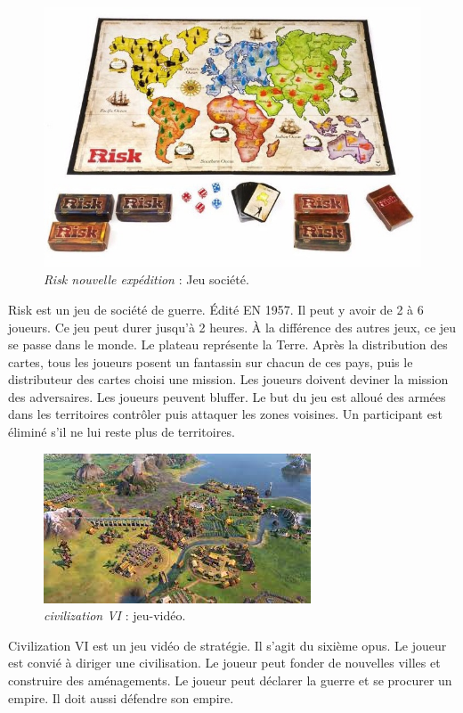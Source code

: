 \begin{figure}[H]
    \centering
    \includegraphics[scale=0.4]{data/risk.jpg}
    \caption{\textit{Risk nouvelle expédition} : Jeu société.}
\end{figure}
Risk est un jeu de société de guerre. Édité EN 1957. Il peut y avoir de 2 à 6 joueurs. Ce jeu peut durer jusqu'à 2 heures. À la différence des autres jeux, ce jeu se passe dans le monde. Le plateau représente la Terre.
Après la distribution des cartes, tous les joueurs posent un fantassin sur chacun de ces pays, puis le distributeur des cartes choisi une mission. Les joueurs doivent deviner la mission des adversaires.
Les joueurs peuvent bluffer.
Le but du jeu est alloué des armées dans les territoires contrôler puis attaquer les zones voisines. Un participant est éliminé s’il ne lui reste plus de territoires.


\begin{figure}[H]
    \centering
    \includegraphics[scale=0.8]{data/civilization.jpeg}
    \caption{\textit{civilization VI} : jeu-vidéo.}
\end{figure}
Civilization VI est un jeu vidéo de stratégie. Il s'agit du sixième opus. Le joueur est convié à diriger une civilisation. Le joueur peut fonder de nouvelles villes et construire des aménagements.
Le joueur peut déclarer la guerre et se procurer un empire. Il doit aussi défendre son empire.


